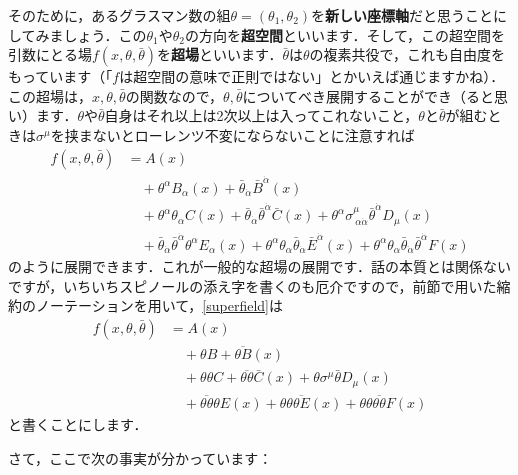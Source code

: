 \documentclass[a4paper,uplatex,dvipdfmx]{jsarticle}
\theoremstyle{definition}
\begin{document}
そのために，あるグラスマン数の組$\theta=(\theta_{1},\theta_{2})$を\textbf{新しい座標軸}だと思うことにしてみましょう．この$\theta_1$や$\theta_2$の方向を\textbf{超空間}といいます．そして，この超空間を引数にとる場$f(x,\theta,\bar{\theta})$を\textbf{超場}といいます．$\bar{\theta}$は$\theta$の複素共役で，これも自由度をもっています（「$f$は超空間の意味で正則ではない」とかいえば通じますかね）．この超場は，$x,\theta,\bar{\theta}$の関数なので，$\theta,\bar{\theta}$についてべき展開することができ（ると思い）ます．$\theta$や$\bar{\theta}$自身はそれ以上は2次以上は入ってこれないこと，$\theta$と$\bar{\theta}$が組むときは$\sigma^{\mu}$を挟まないとローレンツ不変にならないことに注意すれば
\begin{align}
  f(x,\theta,\bar{\theta})
  &=
  A(x)
  \nonumber
  \\
  &\quad
  +
  \theta^{\alpha}B_{\alpha}(x)
  +
  \bar{\theta}_{\dot{\alpha}}\bar{B}^{\dot{\alpha}}(x)
  \nonumber
  \\
  &\quad
  +
  \theta^{\alpha}\theta_{\alpha}C(x)
  +
  \bar{\theta}_{\dot{\alpha}}\bar{\theta}^{\dot{\alpha}}\bar{C}(x)
  +
  \theta^{\alpha}\sigma^{\mu}_{\ \alpha\dot{\alpha}}\bar{\theta}^{\dot{\alpha}}D_{\mu}(x)
  \nonumber
  \\
  &\quad
  +
  \bar{\theta}_{\dot{\alpha}}\bar{\theta}^{\dot{\alpha}}\theta^{\alpha}E_{\alpha}(x)
  +
  \theta^{\alpha}\theta_{\alpha}\bar{\theta}_{\dot{\alpha}}\bar{E}^{\dot{\alpha}}(x)
  +
  \theta^{\alpha}\theta_{\alpha}\bar{\theta}_{\dot{\alpha}}\bar{\theta}^{\dot{\alpha}}F(x)
  \label{superfield}
\end{align}
のように展開できます．これが一般的な超場の展開です．話の本質とは関係ないですが，いちいちスピノールの添え字を書くのも厄介ですので，前節で用いた縮約のノーテーションを用いて，\eqref{superfield}は
\begin{align}f(x,\theta,\bar{\theta})
  &=
  A(x)
  \nonumber
  \\
  &\quad
  +
  \theta B
  +
  \overline{\theta B}(x)
  \nonumber
  \\
  &\quad
  +
  \theta\theta C
  +
  \overline{\theta\theta}\bar{C}(x)
  +
  \theta\sigma^{\mu}\bar{\theta} D_{\mu}(x)
  \nonumber
  \\
  &\quad
  +
  \overline{\theta\theta}\theta E(x)
  +
  \theta\theta\overline{\theta E}(x)
  +
  \theta\theta\overline{\theta\theta}F(x)
  \nonumber  
\end{align}
と書くことにします．

さて，ここで次の事実が分かっています：
\end{document}
